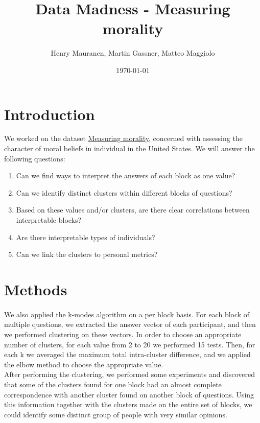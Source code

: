 \documentclass{article}
\title{Data Madness - Measuring morality}
\date{\today}
\author{Henry Mauranen, Martin Gassner, Matteo Maggiolo}
\begin{document}
\maketitle

\section{Introduction}
We worked on the dataset \href{http://kenan.ethics.duke.edu/attitudes/resources/measuring-morality/}{Measuring morality}, concerned with assessing the character of moral beliefs in individual in the United States.
We will answer the following questions:
\begin{enumerate}
\item \label{qs:aggregation} Can we find ways to interpret the answers of each block as one value? 
\item \label{qs:blockCluster} Can we identify distinct clusters within different blocks of questions? 
\item \label{qs:blockCorrelations} Based on these values and/or clusters, are there clear correlations between interpretable blocks? 
\item \label{qs:types} Are there interpretable types of individuals? 
\item \label{qs:personal} Can we link the clusters to personal metrics? 
\end{enumerate}

\section{Methods}

\paragraph{}
We also applied the k-modes algorithm on a per block basis. For each block of multiple questions, we extracted the answer vector of each participant, and then we performed clustering on these vectors. In order to choose an appropriate number of clusters, for each value from 2 to 20 we performed 15 tests. Then, for each k we averaged the maximum total intra-cluster difference, and we applied the elbow method to choose the appropriate value. \\
After performing the clustering, we performed some experiments and discovered that some of the clusters found for one block had an almost complete correspondence with another cluster found on another block of questions. Using this information together with the clusters made on the entire set of blocks, we could identify some distinct group of people with very similar opinions.
\end{document}

